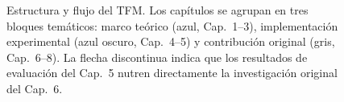 \begin{figure}[!htbp]
\begin{tikzpicture}
\end{tikzpicture}
\caption{Estructura y flujo del TFM. Los capítulos se agrupan en tres bloques temáticos: marco teórico (azul, Cap.~1--3), implementación experimental (azul oscuro, Cap.~4--5) y contribución original (gris, Cap.~6--8). La flecha discontinua indica que los resultados de evaluación del Cap.~5 nutren directamente la investigación original del Cap.~6.}
\label{fig:estructura_tfm}
\end{figure}
